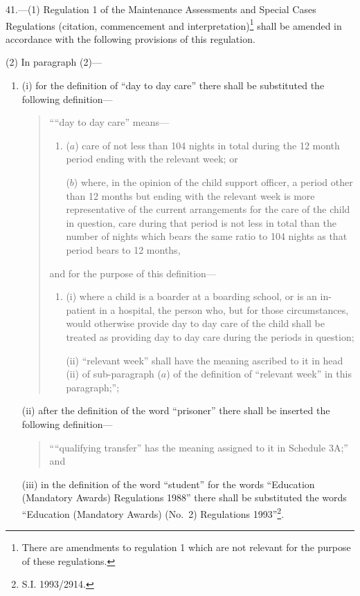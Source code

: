 \documentclass[12pt,a4paper]{article}
\begin{document}
\begin{sloppypar}
41.—(1) Regulation 1 of the Maintenance Assessments and Special Cases Regulations (citation, commencement and interpretation)\footnote{\frenchspacing There are amendments to regulation 1 which are not relevant for the purpose of these regulations.} shall be amended in accordance with the following provisions of this regulation.
\end{sloppypar}

(2) In paragraph (2)—
\begin{enumerate}\item[]
(i) for the definition of “day to day care” there shall be substituted the following definition—
\begin{quotation}
““day to day care” means—
\begin{enumerate}\item[]
($a$) care of not less than 104 nights in total during the 12 month period ending with the relevant week; or

($b$) where, in the opinion of the child support officer, a period other than 12 months but ending with the relevant week is more representative of the current arrangements for the care of the child in question, care during that period is not less in total than the number of nights which bears the same ratio to 104 nights as that period bears to 12 months,
\end{enumerate}
and for the purpose of this definition—
\begin{enumerate}\item[]
(i) where a child is a boarder at a boarding school, or is an in-patient in a hospital, the person who, but for those circumstances, would otherwise provide day to day care of the child shall be treated as providing day to day care during the periods in question;

(ii) “relevant week” shall have the meaning ascribed to it in head (ii) of sub-paragraph ($a$) of the definition of “relevant week” in this paragraph;”;
\end{enumerate}
\end{quotation}

(ii) after the definition of the word “prisoner” there shall be inserted the following definition—
\begin{quotation}
““qualifying transfer” has the meaning assigned to it in Schedule 3A;” and
\end{quotation}

(iii) in the definition of the word “student” for the words “Education (Mandatory Awards) Regulations 1988” there shall be substituted the words
“Education (Mandatory Awards) (No.\ 2) Regulations 1993”\footnote{\frenchspacing S.I. 1993/2914.}.
\end{enumerate}
\end{document}
